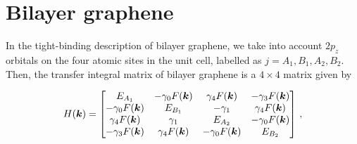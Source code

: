 \section{Bilayer graphene}
\label{sec:bilayer}
In the tight-binding description of bilayer graphene, we take into account $2p_z$ orbitals on the four atomic sites in the unit cell, labelled as $j = A_1, B_1, A_2, B_2$. Then, the transfer integral matrix of bilayer graphene is a $4\times 4$  matrix given by \cite{McCann_2013}

\begin{equation}
    H(\boldsymbol{k})=
    \begin{bmatrix}
        E_{A_1} & -\gamma_0 F(\boldsymbol{k}) & \gamma_4 F(\boldsymbol{k}) & -\gamma_3 F(\boldsymbol{k})\\
        -\gamma_0 F(\boldsymbol{k}) & E_{B_1} & -\gamma_1 & \gamma_4 F(\boldsymbol{k})\\
        \gamma_4 F(\boldsymbol{k}) & \gamma_1 & E_{A_2} & -\gamma_0 F(\boldsymbol{k})\\
        -\gamma_3 F(\boldsymbol{k})& \gamma_4 F(\boldsymbol{k})& -\gamma_0 F(\boldsymbol{k}) & E_{B_2}
    \end{bmatrix}\,,
\end{equation}


